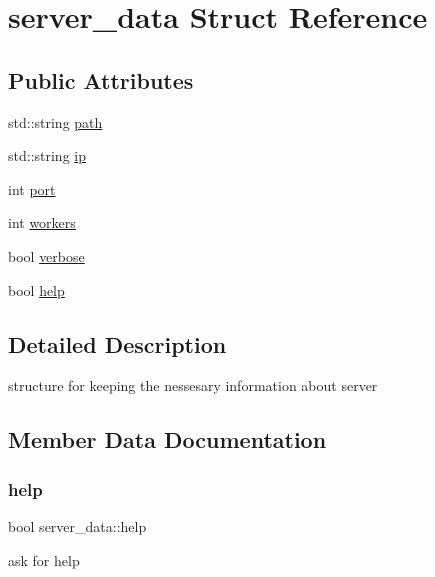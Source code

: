 \hypertarget{structserver__data}{}\section{server\+\_\+data Struct Reference}
\label{structserver__data}
\subsection*{Public Attributes}
\begin{DoxyCompactItemize}
\item 
std\+::string \mbox{\hyperlink{structserver__data_abc29ec2aa302ea07cf1f6f741e10adbf}{path}}
\item 
std\+::string \mbox{\hyperlink{structserver__data_a766de40d7866e79a7c355f0dab3aa6db}{ip}}
\item 
int \mbox{\hyperlink{structserver__data_add87bd108ad6a8709eae3accbc4b3548}{port}}
\item 
int \mbox{\hyperlink{structserver__data_a2bc2eb5db424b921022b97bee01d79f8}{workers}}
\item 
bool \mbox{\hyperlink{structserver__data_ac97d9c5dce9db24cef22b6832a5fe55a}{verbose}}
\item 
bool \mbox{\hyperlink{structserver__data_a96b0ae24675b5032f933faa326bd5a2d}{help}}
\end{DoxyCompactItemize}


\subsection{Detailed Description}
structure for keeping the nessesary information about server 

\subsection{Member Data Documentation}
\mbox{\label{structserver__data_a96b0ae24675b5032f933faa326bd5a2d}} 
\subsubsection{\texorpdfstring{help}{help}}
{\footnotesize\ttfamily bool server\+\_\+data\+::help}

ask for help \mbox{\label{structserver__data_a766de40d7866e79a7c355f0dab3aa6db}} 
